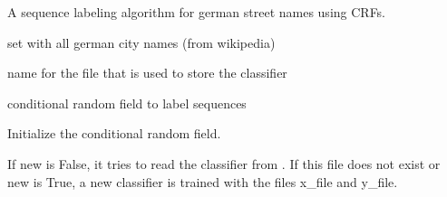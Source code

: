 \documentclass[letterpaper,10pt,english]{sphinxmanual}
\begin{document}
\begin{fulllineitems}
\label{\detokenize{api:impressum_crf.ImpressumCRF}}
A sequence labeling algorithm for german street names using CRFs.

\begin{fulllineitems}
\label{\detokenize{api:impressum_crf.ImpressumCRF.cities}}
set with all german city names (from wikipedia)

\end{fulllineitems}


\begin{fulllineitems}
\label{\detokenize{api:impressum_crf.ImpressumCRF.filename}}
name for the file that is used to store the classifier

\end{fulllineitems}


\begin{fulllineitems}
\label{\detokenize{api:impressum_crf.ImpressumCRF.crf}}
conditional random field to label sequences

\end{fulllineitems}


\begin{fulllineitems}
\label{\detokenize{api:impressum_crf.ImpressumCRF.__init__}}
Initialize the conditional random field.

If new is False, it tries to read the classifier from
. If this file does not exist or new is True, a
new classifier is trained with the files x\_file and y\_file.


\end{fulllineitems}
\end{fulllineitems}
\end{document}
